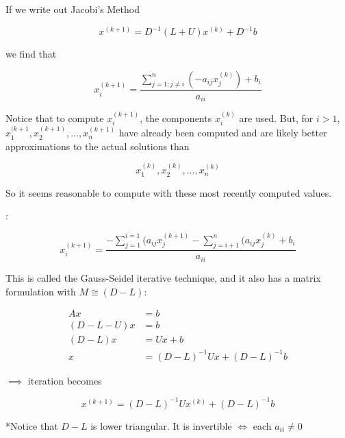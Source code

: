 If we write out Jacobi's Method

\begin{equation*}
  x^{(k+1)} = D^{-1}(L+U)x^{(k)} + D^{-1}b
\end{equation*}

we find that

\begin{equation*}
  x_i^{(k+1)} = \frac{\sum_{j=1; j\ne i}^n (-a_{ij}x_j^{(k)}) +b_i}{a_{ii}}
\end{equation*}

Notice that to compute $x_i^{(k+1)}$, the components $x_i^{(k)}$ are used.
But, for $i>1$, $x_1^{(k+1}, x_2^{(k+1)}, \dots, x_n^{(k+1)}$ have already
been computed and are likely better approximations to the actual solutions than

\begin{equation*}
  x_1^{(k)}, x_2^{(k)}, \dots, x_n^{(k)}
\end{equation*}

So it seems reasonable to compute with these most recently computed values.

\ie:

\begin{equation*}
  x_i^{(k+1)} = \frac{-\sum_{j=1}^{i=1}(a_{ij}x_j^{(k+1)} - \sum_{j=i+1}^{n} (a_{ij} x_j^{(k)} +b_i}{a_{ii}}
\end{equation*}

This is called the Gauss-Seidel iterative technique, and it also has a matrix
formulation with $M\cong (D-L):$

\begin{align*}
  Ax &= b \\
  (D-L-U)x &= b \\
  (D-L)x &= Ux+b \\
  x &= (D-L)^{-1}Ux+(D-L)^{-1}b
\end{align*}

$\implies$ iteration becomes

\begin{equation*}
  x^{(k+1)} = (D-L)^{-1}Ux^{(k)} + (D-L)^{-1}b
\end{equation*}

*Notice that $D-L$ is lower triangular. It is invertible $\iff$ each $a_{ii}\ne 0$

